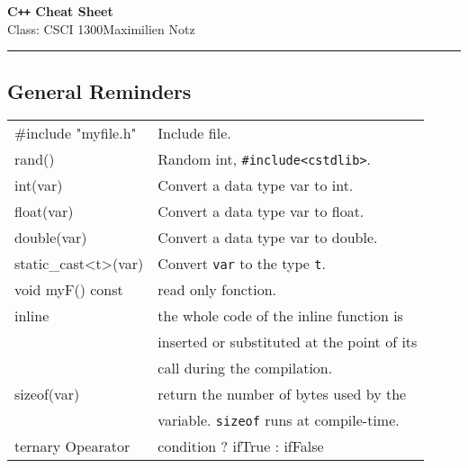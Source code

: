 \documentclass[5pt]{article}
\begin{document}
\begin{center}
     \Large{\textbf{C\texttt{++} Cheat Sheet}}\\
     \small{Class: CSCI 1300}\hfill\small{\textcopyright Maximilien Notz \the\year{}}
     \noindent\rule{20cm}{0.4pt}
\end{center}
\begin{multicols}{2}
\setcounter{secnumdepth}{0}


\subsection{General Reminders}
\begin{tabular}{>{\ttfamily}l l}

\#include "myfile.h"    & Include file.\\
rand()                  & Random int, \texttt{\#include<cstdlib>}.\\
int(var)                & Convert a data type var to int.\\
float(var)              & Convert a data type var to float.\\
double(var)             & Convert a data type var to double.\\
static\_cast<t>(var)    & Convert \texttt{var} to the type \texttt{t}.\\
void myF() const        & read only fonction.\\
inline                  & the whole code of the inline function is\\
                        & inserted or substituted at the point of its\\
                        & call during the compilation.\\
sizeof(var)             & return the number of bytes used by the\\
                        & variable. \texttt{sizeof} runs at compile-time.\\
ternary Opearator       & condition ? ifTrue : ifFalse\\
\end{tabular}



\end{multicols}
\end{document}
